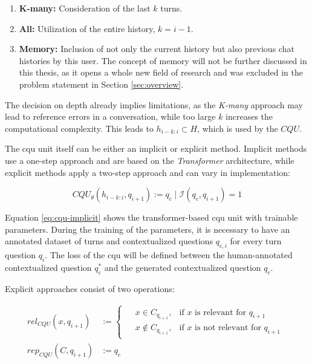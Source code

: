 \begin{enumerate}
    \item \textbf{K-many:} Consideration of the last $k$ turns.
    \item \textbf{All:} Utilization of the entire history, $k = i - 1$.
    \item \textbf{Memory:} Inclusion of not only the current history but also previous chat histories by this user. The concept of memory will not be further discussed in this thesis, as it opens a whole new field of research and was excluded in the problem statement in Section \ref{sec:overview}.
\end{enumerate}

The decision on depth already implies limitations, as the \textit{K-many} approach may lead to reference errors in a conversation, while too large $k$ increases the computational complexity. This leads to $h_{i-k:i} \subset H$, which is used by the $CQU$.

The \gls{cqu} unit itself can be either an implicit or explicit method. Implicit methods use a one-step approach and are based on the \textit{Transformer} architecture, while explicit methods apply a two-step approach and can vary in implementation:

\begin{equation}
    CQU_{\theta}(h_{i-k:i}, q_{i+1}) := q_c \mid \mathcal{I}(q_c, q_{i+1}) = 1 
    \label{eq:cqu-implicit} 
\end{equation}

Equation \ref{eq:cqu-implicit} shows the transformer-based \gls{cqu} unit with trainable parameters. During the training of the parameters, it is necessary to have an annotated dataset of turns and contextualized questions $q_{c,i}$ for every turn question $q_i$. The loss of the \gls{cqu} will be defined between the human-annotated contextualized question $q_c^*$ and the generated contextualized question $q_c$.

Explicit approaches consist of two operations:

\begin{align}
    rel_{CQU}(x, q_{i+1}) &:= 
    \begin{cases}
        \begin{aligned}
            & x \in C_{q_{i+1}}, & \text{if } x \text{ is relevant for } q_{i+1}\\
            & x \not\in C_{q_{i+1}}, & \text{if }  x \text{ is not relevant for } q_{i+1}
        \end{aligned}
    \end{cases} \\
    rep_{CQU}(C, q_{i+1}) &:= q_c
\end{align}

